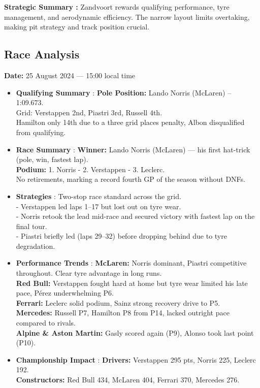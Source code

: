 \textbf{Strategic Summary :} Zandvoort rewards qualifying performance, tyre management, and aerodynamic efficiency. The narrow layout limits overtaking, making pit strategy and track position crucial.

\subsection{Race Analysis}

\textbf{Date:} 25 August 2024 — 15:00 local time 

\begin{itemize}
    \item \textbf{Qualifying Summary} : \textbf{Pole Position:} Lando Norris (McLaren) – 1:09.673. \\
    Grid: Verstappen 2nd, Piastri 3rd, Russell 4th. \\
    Hamilton only 14th due to a three grid places penalty, Albon disqualified from qualifying.
    
    \item \textbf{Race Summary} : \textbf{Winner:} Lando Norris (McLaren) — his first hat-trick (pole, win, fastest lap). \\
    \textbf{Podium:} 1. Norris - 2. Verstappen - 3. Leclerc. \\
    No retirements, marking a record fourth GP of the season without DNFs.
    
    \item \textbf{Strategies} : Two-stop race standard across the grid. \\
    - Verstappen led laps 1–17 but lost out on tyre wear. \\
    - Norris retook the lead mid-race and secured victory with fastest lap on the final tour. \\
    - Piastri briefly led (laps 29–32) before dropping behind due to tyre degradation.
    
    \item \textbf{Performance Trends} : 
    \textbf{McLaren:} Norris dominant, Piastri competitive throughout. Clear tyre advantage in long runs. \\
    \textbf{Red Bull:} Verstappen fought hard at home but tyre wear limited his late pace, Pérez underwhelming P6. \\
    \textbf{Ferrari:} Leclerc solid podium, Sainz strong recovery drive to P5. \\
    \textbf{Mercedes:} Russell P7, Hamilton P8 from P14, lacked outright pace compared to rivals. \\
    \textbf{Alpine \& Aston Martin:} Gasly scored again (P9), Alonso took last point (P10).
    
    \item \textbf{Championship Impact} : \textbf{Drivers:} Verstappen 295 pts, Norris 225, Leclerc 192. \\
    \textbf{Constructors:} Red Bull 434, McLaren 404, Ferrari 370, Mercedes 276.
\end{itemize}

